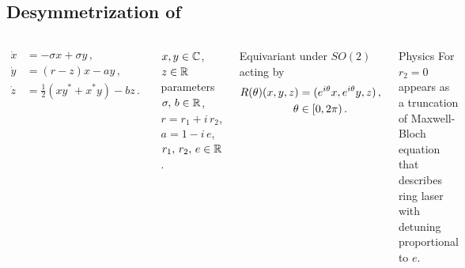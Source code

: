 \documentclass{beamer}
\begin{document}
\subsection{Desymmetrization of \CLe}

\begin{frame}{\CLe}
  \begin{columns}[t]
    \begin{exampleblock}{\CLe}
      	\[
		\begin{split}
			\dot{x} &=-\sigma x+ \sigma y \,,\\
			\dot{y} &=(r-z)x-a y \,,\\
			\dot{z} &= \frac{1}{2}\left(x y^*+x^*y\right)-b z\,.
		\end{split}
	\]
    \end{exampleblock}
     \begin{block}{ }
       $x,y\in\mathbb{C}^{}$, $z\in\mathbb{R}^{}$ parameters $\sigma,\,b\in\mathbb{R}^{}$, $r=r_1+i\, r_2$, $a=1-i\, e$, $r_1,\,r_2,\,e\in\mathbb{R}^{}$.
    \end{block}

    \begin{exampleblock}{Equivariant under}
	$SO(2)$ acting by
      	\[
	\begin{split}
 		R(\theta) (x,y,z) &= (e^{i\theta} x, e^{i\theta} y, z)\,, \\
			\theta	& \in[0,2\pi)\,.
	\end{split}
	\]
    \end{exampleblock}
    \begin{exampleblock}{Physics}
	For $r_2=0$ appears as a truncation of Maxwell-Bloch equation
	that describes ring laser with detuning proportional to $e$.
    \end{exampleblock}

  \end{columns}
\end{frame}
\end{document}
